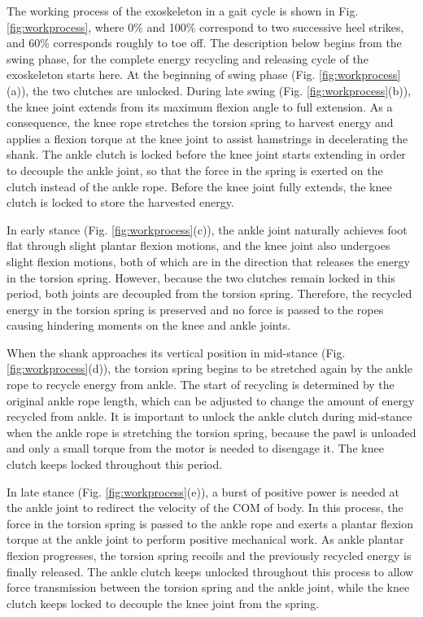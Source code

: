 \documentclass[twocolumn,cleanfoot,10pt]{asme2ej}
\begin{document}
The working process of the exoskeleton in a gait cycle is shown in Fig. \ref{fig:workprocess}, where 0\% and 100\% correspond to two successive heel strikes, and 60\% corresponds roughly to toe off.
The description below begins from the swing phase, for the complete energy recycling and releasing cycle of the exoskeleton starts here.
At the beginning of swing phase (Fig. \ref{fig:workprocess}(a)), the two clutches are unlocked.
During late swing (Fig. \ref{fig:workprocess}(b)), the knee joint extends from its maximum flexion angle to full extension.
As a consequence, the knee rope stretches the torsion spring to harvest energy and applies a flexion torque at the knee joint to assist hamstrings in decelerating the shank.
The ankle clutch is locked before the knee joint starts extending in order to decouple the ankle joint, so that the force in the spring is exerted on the clutch instead of the ankle rope.
Before the knee joint fully extends, the knee clutch is locked to store the harvested energy.

In early stance (Fig. \ref{fig:workprocess}(c)), the ankle joint naturally achieves foot flat through slight plantar flexion motions, and the knee joint also undergoes slight flexion motions, both of which are in the direction that releases the energy in the torsion spring.
However, because the two clutches remain locked in this period, both joints are decoupled from the torsion spring.
Therefore, the recycled energy in the torsion spring is preserved and no force is passed to the ropes causing hindering moments on the knee and ankle joints.

When the shank approaches its vertical position in mid-stance (Fig. \ref{fig:workprocess}(d)), the torsion spring begins to be stretched again by the ankle rope to recycle energy from ankle.
The start of recycling is determined by the original ankle rope length, which can be adjusted to change the amount of energy recycled from ankle.
It is important to unlock the ankle clutch during mid-stance when the ankle rope is stretching the torsion spring, because the pawl is unloaded and only a small torque from the motor is needed to disengage it.
The knee clutch keeps locked throughout this period.

In late stance (Fig. \ref{fig:workprocess}(e)), a burst of positive power is needed at the ankle joint to redirect the velocity of the COM of body.
In this process, the force in the torsion spring is passed to the ankle rope and exerts a plantar flexion torque at the ankle joint to perform positive mechanical work.
As ankle plantar flexion progresses, the torsion spring recoils and the previously recycled energy is finally released.
The ankle clutch keeps unlocked throughout this process to allow force transmission between the torsion spring and the ankle joint, while the knee clutch keeps locked to decouple the knee joint from the spring.
\end{document}
